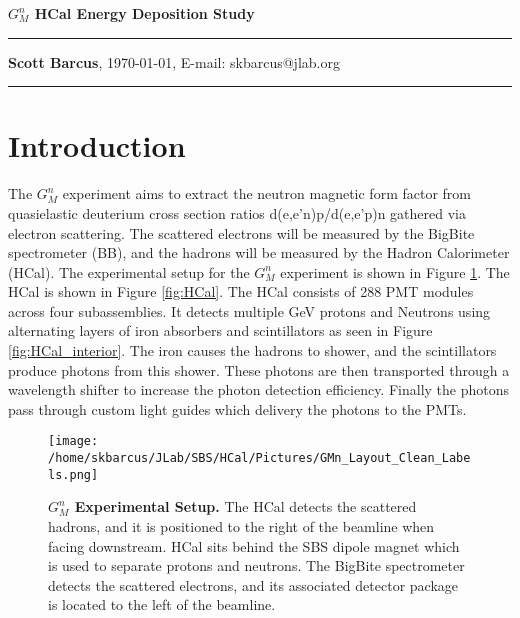 \documentclass[10pt]{article}
\date{}
\begin{document}
\begin{flushleft}
{\Large
\textbf{$G_M^n$ HCal Energy Deposition Study}
}
\\
\vspace{4mm}
\hrule height 0.8pt \relax
\vspace{2mm}
\textbf{Scott Barcus}, \today, E-mail: skbarcus@jlab.org
\end{flushleft}
\vspace{-2mm}
\hrule height 0.8pt \relax
\vspace{6mm}

\setlength{\parindent}{0.5cm}


\section{Introduction}

The $G_M^n$ experiment aims to extract the neutron magnetic form factor from quasielastic deuterium cross section ratios d(e,e'n)p/d(e,e'p)n gathered via electron scattering. The scattered electrons will be measured by the BigBite spectrometer (BB), and the hadrons will be measured by the Hadron Calorimeter (HCal). The experimental setup for the $G_M^n$ experiment is shown in Figure \ref{fig:gmn_setup}. The HCal is shown in Figure \ref{fig:HCal}. The HCal consists of 288 PMT modules across four subassemblies. It detects multiple GeV protons and Neutrons using alternating layers of iron absorbers and scintillators as seen in Figure \ref{fig:HCal_interior}. The iron causes the hadrons to shower, and the scintillators produce photons from this shower. These photons are then transported through a wavelength shifter to increase the photon detection efficiency. Finally the photons pass through custom light guides which delivery the photons to the PMTs. \\

	\begin{figure}[!ht]
	\begin{center}
	\texttt{[image: /home/skbarcus/JLab/SBS/HCal/Pictures/GMn\_Layout\_Clean\_Labels.png]}
	\end{center}
	\caption{
	{\bf{$G_M^n$ Experimental Setup.}} The HCal detects the scattered hadrons, and it is positioned to the right of the beamline when facing downstream. HCal sits behind the SBS dipole magnet which is used to separate protons and neutrons. The BigBite spectrometer detects the scattered electrons, and its associated detector package is located to the left of the beamline.}
	\label{fig:gmn_setup}
	\end{figure}	
	
\end{document}
